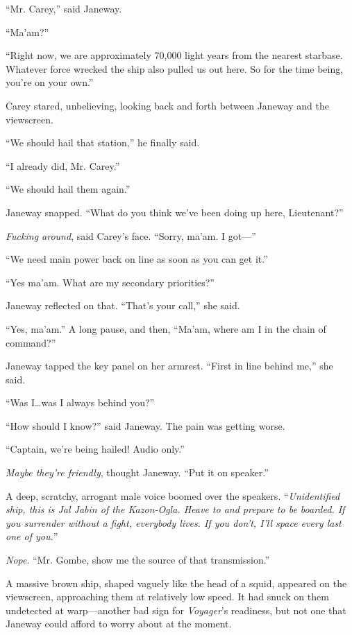 \documentclass[twoside,letterpaper,12pt]{memoir}
\begin{document}
``Mr. Carey,'' said Janeway.

``Ma'am?''

``Right now, we are approximately 70,000 light years from the nearest starbase. Whatever force wrecked the ship also pulled us out here. So for the time being, you're on your own.''

Carey stared, unbelieving, looking back and forth between Janeway and the viewscreen.

``We should hail that station,'' he finally said.

``I already did, Mr. Carey.''

``We should hail them again.''

Janeway snapped. ``What do you think we've been doing up here, Lieutenant?''

\textit{Fucking around}, said Carey's face. ``Sorry, ma'am. I got---''

``We need main power back on line as soon as you can get it.''

``Yes ma'am. What are my secondary priorities?''

Janeway reflected on that. ``That's your call,'' she said.

``Yes, ma'am.'' A long pause, and then, ``Ma'am, where am I in the chain of command?''

Janeway tapped the key panel on her armrest. ``First in line behind me,'' she said.

``Was I\ldots was I always behind you?''

``How should I know?'' said Janeway. The pain was getting worse.

``Captain, we're being hailed! Audio only.''

\textit{Maybe they're friendly}, thought Janeway. ``Put it on speaker.''

A deep, scratchy, arrogant male voice boomed over the speakers. ``\textit{Unidentified ship, this is Jal Jabin of the Kazon-Ogla. Heave to and prepare to be boarded. If you surrender without a fight, everybody lives. If you don't, I'll space every last one of you.}''

\textit{Nope}. ``Mr. Gombe, show me the source of that transmission.''

A massive brown ship, shaped vaguely like the head of a squid, appeared on the viewscreen, approaching them at relatively low speed. It had snuck on them undetected at warp---another bad sign for \textit{Voyager}'s readiness, but not one that Janeway could afford to worry about at the moment.
\end{document}
